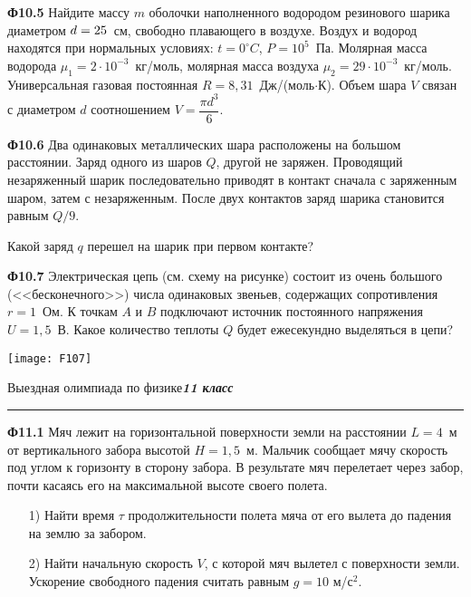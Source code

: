 \documentclass[12pt, a4paper, usenames]{article}
\newcommand*{\hm}[1]{#1\nobreak\discretionary{}%
{\hbox{$\mathsurround=0pt #1$}}{}}
\begin{document}
\bigskip

{\bf Ф10.5} Найдите массу $m$ оболочки наполненного водородом резинового шарика диаметром $d \hm= 25$~см, свободно плавающего  в воздухе. Воздух и водород находятся при нормальных условиях: $t = 0^\circ C$, $P = 10^5$~Па. Молярная масса водорода  $\mu_1 = 2\cdot 10^{-3}$~кг/моль, молярная масса воздуха $\mu_2 = 29\cdot10^{-3}$~кг/моль.  Универсальная газовая постоянная $R = 8{,}31$~Дж/(моль$\cdot$К). Объем   шара $V$ связан с диаметром $d$ соотношением $V = \dfrac{\pi d^3}{6}$. 

\bigskip

{\bf Ф10.6} Два одинаковых металлических шара расположены на большом расстоянии. Заряд одного из шаров $Q$, другой не заряжен. Проводящий незаряженный шарик последовательно приводят в контакт сначала с заряженным шаром, затем с незаряженным. После двух контактов заряд шарика становится равным $Q/9$. 

Какой заряд $q$ перешел на шарик при первом контакте?

\bigskip

{\bf Ф10.7} Электрическая  цепь (см. схему на рисунке) состоит из очень большого (<<бесконечного>>) числа одинаковых звеньев, содержащих сопротивления $r = 1$~Ом.  К точкам $A$ и $B$ подключают источник постоянного напряжения $U = 1{,}5$~В. Какое количество теплоты $Q$ будет ежесекундно выделяться в цепи?

\texttt{[image: F107]}

\bigskip

\newpage
\begin{center}
Выездная олимпиада по физике\hfill\textit{\bf 11 класс}
\hrule\medskip
\end{center}

{\bf Ф11.1} Мяч лежит на горизонтальной поверхности земли на расстоянии $L= 4$~м от вертикального забора высотой $H= 1{,}5$~м. Мальчик сообщает мячу скорость под углом к горизонту в сторону забора. В результате мяч перелетает через забор, почти касаясь его на максимальной высоте своего полета.
\begin{itemize}
\item[1)] Найти время $\tau$ продолжительности полета мяча от его вылета до падения на землю за забором.
\item[2)] Найти начальную скорость $V$, с которой мяч вылетел с поверхности земли.
Ускорение свободного падения считать равным $g = 10$ м/с$^2$.
\end{itemize}

\bigskip
\end{document}
